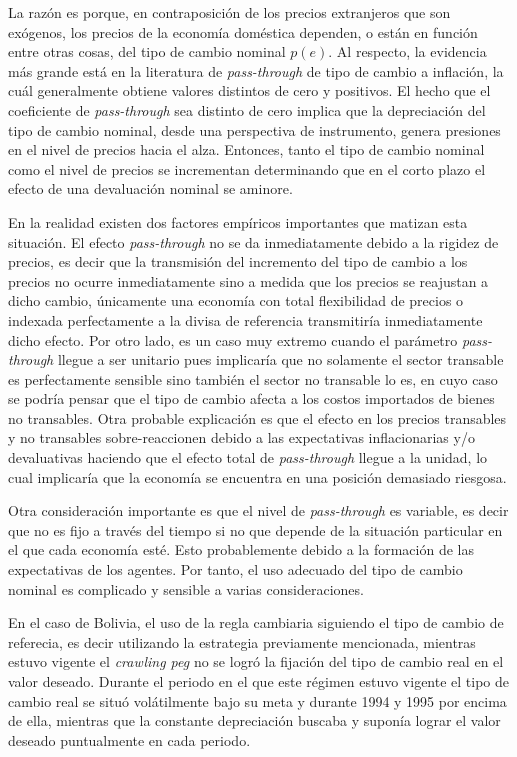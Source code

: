 \documentclass[12pt,letterpaper]{article}
\begin{document}
La razón es porque, en contraposición de los precios extranjeros que son exógenos, los precios de la economía doméstica dependen, o están en función entre otras cosas, del tipo de cambio nominal $p(e)$. Al respecto, la evidencia más grande está en la literatura de \emph{pass-through} de tipo de cambio a inflación, la cuál generalmente obtiene valores distintos de cero y positivos. El hecho que el coeficiente de \emph{pass-through} sea distinto de cero implica que la depreciación del tipo de cambio nominal, desde una perspectiva de instrumento, genera presiones en el nivel de precios hacia el alza. Entonces, tanto el tipo de cambio nominal como el nivel de precios se incrementan determinando que en el corto plazo el efecto de una devaluación nominal se aminore.

En la realidad existen dos factores empíricos importantes que matizan esta situación. El efecto \emph{pass-through} no se da inmediatamente debido a la rigidez de precios, es decir que la transmisión del incremento del tipo de cambio a los precios no ocurre inmediatamente sino a medida que los precios se reajustan a dicho cambio, únicamente una economía con total flexibilidad de precios o indexada perfectamente a la divisa de referencia transmitiría inmediatamente dicho efecto. Por otro lado, es un caso muy extremo cuando el parámetro \emph{pass-through} llegue a ser unitario pues implicaría que no solamente el sector transable es perfectamente sensible sino también el sector no transable lo es, en cuyo caso se podría pensar que el tipo de cambio afecta a los costos importados de bienes no transables. Otra probable explicación es que el efecto en los precios transables y no transables sobre-reaccionen debido a las expectativas inflacionarias y/o devaluativas haciendo que el efecto total de \emph{pass-through} llegue a la unidad, lo cual implicaría que la economía se encuentra en una posición demasiado riesgosa.

Otra consideración importante es que el nivel de \emph{pass-through} es variable, es decir que no es fijo a través del tiempo si no que depende de la situación particular en el que cada economía esté. Esto probablemente debido a la formación de las expectativas de los agentes. Por tanto, el uso adecuado del tipo de cambio nominal es complicado y sensible a varias consideraciones.

En el caso de Bolivia, el uso de la regla cambiaria siguiendo el tipo de cambio de referecia, es decir  utilizando la estrategia previamente mencionada, mientras estuvo vigente el \emph{crawling peg} no se logró la fijación del tipo de cambio real en el valor deseado. Durante el periodo en el que este régimen estuvo vigente el tipo de cambio real se situó volátilmente bajo su meta y durante 1994 y 1995 por encima de ella, mientras que la constante depreciación buscaba y suponía lograr el valor deseado puntualmente en cada periodo.
\end{document}
